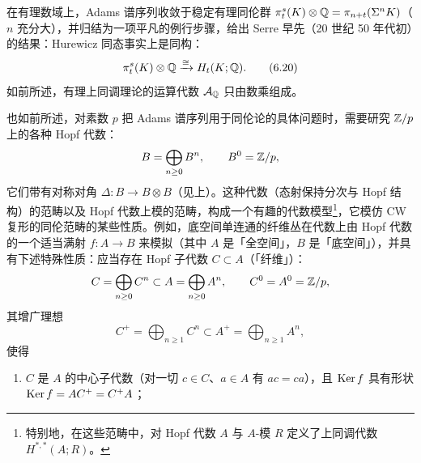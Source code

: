 在有理数域上，Adams 谱序列收敛于稳定有理同伦群 $\pi_t^s(K)\otimes\mathbb{Q}=\pi_{n+t}(\Sigma^nK)$（$n$ 充分大），并归结为一项平凡的例行步骤，给出 Serre 早先（20 世纪 50 年代初）的结果：Hurewicz 同态事实上是同构：
\begin{equation}
\pi_t^s(K)\otimes\mathbb{Q}\xrightarrow{\cong}H_t(K;\mathbb{Q}). \tag{6.20}
\end{equation}
如前所述，有理上同调理论的运算代数 $\mathcal{A}_{\mathbb{Q}}$ 只由数乘组成。

也如前所述，对素数 $p$ 把 Adams 谱序列用于同伦论的具体问题时，需要研究 $\mathbb{Z}/p$ 上的各种 Hopf 代数：
\[
B=\bigoplus_{n\ge0}B^n,\qquad B^0=\mathbb{Z}/p,
\]
它们带有对称对角 $\Delta:B\to B\otimes B$（见上）。这种代数（态射保持分次与 Hopf 结构）的范畴以及 Hopf 代数上模的范畴，构成一个有趣的代数模型\footnote{特别地，在这些范畴中，对 Hopf 代数 $A$ 与 $A$-模 $R$ 定义了上同调代数 $H^{*,*}(A;R)$。}，它模仿 CW 复形的同伦范畴的某些性质。例如，底空间单连通的纤维丛在代数上由 Hopf 代数的一个适当满射 $f:A\to B$ 来模拟（其中 $A$ 是「全空间」，$B$ 是「底空间」），并具有下述特殊性质：应当存在 Hopf 子代数 $C\subset A$（「纤维」）：
\[
C=\bigoplus_{n\ge0}C^n\subset A=\bigoplus_{n\ge0}A^n,\qquad C^0=A^0=\mathbb{Z}/p,
\]
其增广理想
\[
C^+=\bigoplus_{n\ge1}C^n\subset A^+=\bigoplus_{n\ge1}A^n,
\]
使得
\begin{enumerate}[label=(\roman*),leftmargin=2.2em]
\item $C$ 是 $A$ 的中心子代数（对一切 $c\in C$、$a\in A$ 有 $ac=ca$），且 $\operatorname{Ker} f$ 具有形状 $\operatorname{Ker} f=AC^+=C^+A$；
\end{enumerate}
